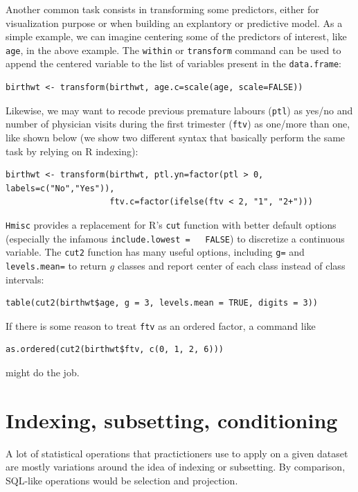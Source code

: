 \documentclass[a4paper,twoside]{book}
\renewcommand{\texttt}[1]{\lstinline{#1}}
\newcommand{\R}{\textsf{R}\xspace}
\begin{document}
Another common task consists in transforming some predictors, either
for visualization purpose or when building an explantory or predictive
model. As a simple example, we can imagine centering some of the
predictors of interest, like \texttt{age}, in the above example. The
\texttt{within} or \texttt{transform} command can be used to append
the centered variable to the list of variables present in the
\texttt{data.frame}:
\begin{verbatim}
birthwt <- transform(birthwt, age.c=scale(age, scale=FALSE))
\end{verbatim}

Likewise, we may want to recode previous premature labours
(\texttt{ptl}) as yes/no and number of physician visits during the
first trimester (\texttt{ftv}) as one/more than one, like shown below
(we show two different syntax that basically perform the same task by
relying on \R indexing):
\begin{verbatim}
birthwt <- transform(birthwt, ptl.yn=factor(ptl > 0, labels=c("No","Yes")), 
                     ftv.c=factor(ifelse(ftv < 2, "1", "2+")))
\end{verbatim}

\texttt{Hmisc} provides a replacement for R's \texttt{cut} function with
better default options (especially the infamous \texttt{include.lowest =
  FALSE}) to discretize a continuous variable. The \texttt{cut2} function
has many useful options, including \texttt{g=} and \texttt{levels.mean=} to
return $g$ classes and report center of each class instead of class
intervals:
\begin{verbatim}
table(cut2(birthwt$age, g = 3, levels.mean = TRUE, digits = 3))
\end{verbatim}

If there is some reason to treat \texttt{ftv} as an ordered factor,
a command like
\begin{verbatim}
as.ordered(cut2(birthwt$ftv, c(0, 1, 2, 6)))
\end{verbatim}
might do the job.

\section{Indexing, subsetting, conditioning}
A lot of statistical operations that practictioners use to apply on a
given dataset are mostly variations around the idea of indexing or
subsetting. By comparison, SQL-like operations would be selection and
projection. 

\end{document}
